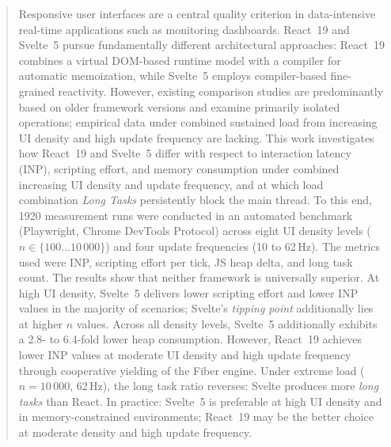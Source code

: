 \renewcommand\abstractname{Abstract}
\begin{abstract}
Responsive user interfaces are a central quality criterion in
data-intensive real-time applications such as monitoring dashboards.
React~19 and Svelte~5 pursue fundamentally different architectural
approaches: React~19 combines a virtual DOM-based runtime model with
a compiler for automatic memoization, while Svelte~5 employs
compiler-based fine-grained reactivity. However, existing comparison
studies are predominantly based on older framework versions and
examine primarily isolated operations; empirical data under combined
sustained load from increasing UI density and high update frequency
are lacking. This work investigates how React~19 and Svelte~5 differ
with respect to interaction latency (INP), scripting effort, and
memory consumption under combined increasing UI density and update
frequency, and at which load combination \textit{Long Tasks} persistently
block the main thread. To this end, 1920 measurement runs were
conducted in an automated benchmark (Playwright, Chrome DevTools
Protocol) across eight UI density levels ($n \in \{100 \ldots
10\,000\}$) and four update frequencies (10 to 62\,Hz). The metrics
used were INP, scripting effort per tick, JS heap delta, and long
task count. The results show that neither framework is universally
superior. At high UI density, Svelte~5 delivers lower scripting
effort and lower INP values in the majority of scenarios; Svelte's
\textit{tipping point} additionally lies at higher $n$ values. Across all
density levels, Svelte~5 additionally exhibits a 2.8- to 6.4-fold lower heap
consumption. However, React~19 achieves lower INP values at moderate
UI density and high update frequency through cooperative yielding of
the Fiber engine. Under extreme load ($n = 10\,000$, 62\,Hz), the long
task ratio reverses: Svelte produces more \textit{long tasks} than React. In practice: Svelte~5
is preferable at high UI density and in memory-constrained
environments; React~19 may be the better choice at moderate density
and high update frequency.
\end{abstract}